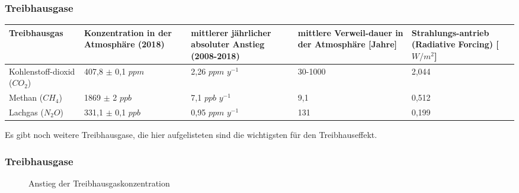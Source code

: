 \begin{frame}
	\frametitle{Treibhausgase}
	
	
	
	\begin{tabular}{p{2.5cm}|p{3cm}|p{3cm}|p{2cm}|p{2cm}}
		Treibhausgas & Konzentration in der Atmosphäre (2018) & mittlerer jährlicher absoluter Anstieg (2008-2018) & mittlere Verweil-dauer in der Atmosphäre [Jahre] & Strahlungs-antrieb (Radiative Forcing) [$W/m^2$] \\ 
		\hline 
		Kohlenstoff-dioxid ($CO_2$) & 407,8 $\pm$ 0,1 $ppm$ & 2,26 $ppm$ $y^{-1}$ &  30-1000 & 2,044 \\ 
		\hline 
		Methan ($CH_4$) & 1869 $\pm$ 2 $ppb$ & 7,1 $ppb$ $y^{-1}$ &9,1 & 0,512  \\ 
		\hline 
		Lachgas ($N_2O$) & 331,1 $\pm$ 0,1 $ppb$ & 0,95 $ppm$ $y^{-1}$ & 131 & 0,199  \\ 
	\end{tabular} 
	Es gibt noch weitere Treibhausgase, die hier aufgelisteten sind die wichtigsten für den Treibhauseffekt.
	
\end{frame}

\begin{frame}
	\frametitle{Treibhausgase}
	\begin{figure}
		\caption{Anstieg der Treibhausgaskonzentration}
	\end{figure}
\end{frame}

